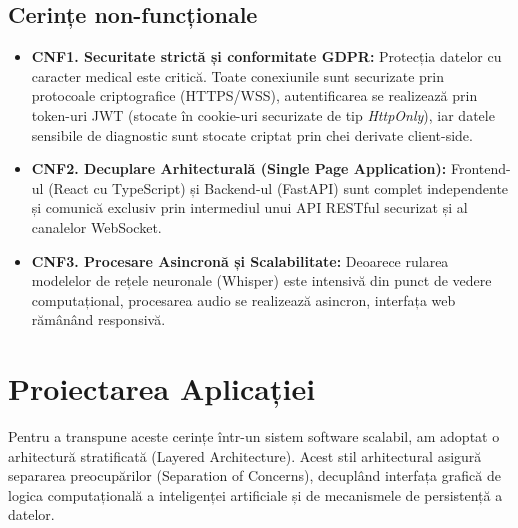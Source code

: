 \subsection{Cerințe non-funcționale}
\begin{itemize}
    \item \textbf{CNF1. Securitate strictă și conformitate GDPR:} Protecția datelor cu caracter medical este critică. Toate conexiunile sunt securizate prin protocoale criptografice (HTTPS/WSS), autentificarea se realizează prin token-uri JWT (stocate în cookie-uri securizate de tip \textit{HttpOnly}), iar datele sensibile de diagnostic sunt stocate criptat prin chei derivate client-side.
    \item \textbf{CNF2. Decuplare Arhitecturală (Single Page Application):} Frontend-ul (React cu TypeScript) și Backend-ul (FastAPI) sunt complet independente și comunică exclusiv prin intermediul unui API RESTful securizat și al canalelor WebSocket.
    \item \textbf{CNF3. Procesare Asincronă și Scalabilitate:} Deoarece rularea modelelor de rețele neuronale (Whisper) este intensivă din punct de vedere computațional, procesarea audio se realizează asincron, interfața web rămânând responsivă.
\end{itemize}

\section{Proiectarea Aplicației}
\label{sec:ch3sec2}

Pentru a transpune aceste cerințe într-un sistem software scalabil, am adoptat o arhitectură stratificată (Layered Architecture). Acest stil arhitectural asigură separarea preocupărilor (Separation of Concerns), decuplând interfața grafică de logica computațională a inteligenței artificiale și de mecanismele de persistență a datelor.

